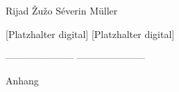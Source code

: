 \documentclass{article}
\begin{document}
\centering
Rijad \v{Z}u\v{z}o \hspace{80mm}Séverin Müller


\vspace{15mm}

[Platzhalter digital] \hspace{70mm} [Platzhalter digital]

--------------------- \hspace{73mm}---------------------
\newpage


\centering
\vspace*{110mm} \huge Anhang
\end{document}

